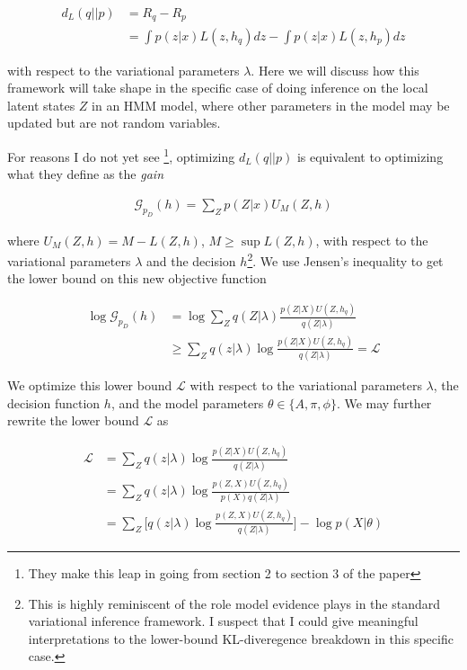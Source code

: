 \documentclass{article}
\begin{document}
\begin{align}
d_L(q||p) &= R_q - R_p \\
          &= \int p(z|x) L(z, h_q) dz - \int p(z|x) L(z, h_p) dz
\end{align}

with respect to the variational parameters $\lambda$. Here we will discuss how this framework will take shape in the specific case of doing inference on the local latent states $Z$ in an HMM model, where other parameters in the model may be updated but are not random variables. 

For reasons I do not yet see \footnote{They make this leap in going from section 2 to section 3 of the paper}, optimizing $d_L(q||p)$ is equivalent to optimizing what they define as the \textit{gain}

\begin{align}
\mathcal{G}_{p_D}(h) = \sum_Z p(Z|x) U_M(Z, h)
\end{align}

where $U_M(Z,h) = M - L(Z,h)$, $M \geq \sup L(Z,h)$, with respect to the variational parameters $\lambda$ and the decision $h$\footnote{This is highly reminiscent of the role model evidence plays in the standard variational inference framework. I suspect that I could give meaningful interpretations to the lower-bound KL-diveregence breakdown in this specific case.}. We use Jensen's inequality to get the lower bound on this new objective function

\begin{align}
\log \mathcal{G}_{p_D}(h) &= \log \sum_Z q(Z|\lambda) \frac{p(Z|X)U(Z,h_q)}{q(Z|\lambda)} \\
                          &\geq \sum_Z q(z|\lambda) \log \frac{p(Z|X)U(Z,h_q)}{q(Z|\lambda)} = \mathcal{L}
\end{align}


 We optimize this lower bound $\mathcal{L}$ with respect to the variational parameters $\lambda$, the decision function $h$, and the model parameters $\theta \in \{ A, \pi, \phi \}$. We may further rewrite the lower bound $\mathcal{L}$ as 
 
\begin{align}
\mathcal{L} &= \sum_Z q(z|\lambda) \log \frac{p(Z|X)U(Z,h_q)}{q(Z|\lambda)} \\
            &= \sum_Z q(z|\lambda) \log \frac{p(Z,X)U(Z,h_q)}{p(X) q(Z|\lambda)} \\
            &= \sum_Z \Big[ q(z|\lambda) \log \frac{p(Z,X)U(Z,h_q)}{q(Z|\lambda)} \Big] - \log p(X|\theta) \label{elbo}
\end{align}
 
\end{document}

